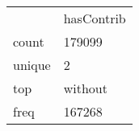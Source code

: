\begin{tabular}{ll}
 & hasContrib \\
count & 179099 \\
unique & 2 \\
top & without \\
freq & 167268 \\
\end{tabular}
